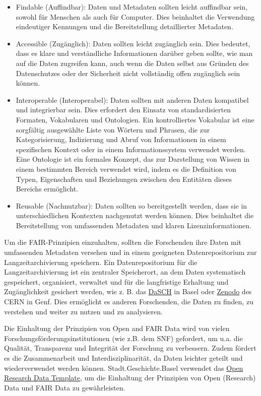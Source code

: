 \documentclass[
  nswissgerman,
  letterpaper,
  DIV=11,
  numbers=noendperiod]{scrartcl}
\begin{document}
\begin{itemize}
\item
  Findable (Auffindbar): Daten und Metadaten sollten leicht auffindbar
  sein, sowohl für Menschen als auch für Computer. Dies beinhaltet die
  Verwendung eindeutiger Kennungen und die Bereitstellung detaillierter
  Metadaten.
\item
  Accessible (Zugänglich): Daten sollten leicht zugänglich sein. Dies
  bedeutet, dass es klare und verständliche Informationen darüber geben
  sollte, wie man auf die Daten zugreifen kann, auch wenn die Daten
  selbst aus Gründen des Datenschutzes oder der Sicherheit nicht
  vollständig offen zugänglich sein können.
\item
  Interoperable (Interoperabel): Daten sollten mit anderen Daten
  kompatibel und integrierbar sein. Dies erfordert den Einsatz von
  standardisierten Formaten, Vokabularen und Ontologien. Ein
  kontrolliertes Vokabular ist eine sorgfältig ausgewählte Liste von
  Wörtern und Phrasen, die zur Kategorisierung, Indizierung und Abruf
  von Informationen in einem spezifischen Kontext oder in einem
  Informationssystem verwendet werden. Eine Ontologie ist ein formales
  Konzept, das zur Darstellung von Wissen in einem bestimmten Bereich
  verwendet wird, indem es die Definition von Typen, Eigenschaften und
  Beziehungen zwischen den Entitäten dieses Bereichs ermöglicht.
\item
  Reusable (Nachnutzbar): Daten sollten so bereitgestellt werden, dass
  sie in unterschiedlichen Kontexten nachgenutzt werden können. Dies
  beinhaltet die Bereitstellung von umfassenden Metadaten und klaren
  Lizenzinformationen.
\end{itemize}

Um die FAIR-Prinzipien einzuhalten, sollten die Forschenden ihre Daten
mit umfassenden Metadaten versehen und in einem geeigneten
Datenrepositorium zur Langzeitarchivierung speichern. Ein
Datenrepositorium für die Langzeitarchivierung ist ein zentraler
Speicherort, an dem Daten systematisch gespeichert, organisiert,
verwaltet und für die langfristige Erhaltung und Zugänglichkeit
gesichert werden, wie z. B. das \href{https://www.dasch.swiss/}{DaSCH}
in Basel oder \href{https://zenodo.org/}{Zenodo} des CERN in Genf. Dies
ermöglicht es anderen Forschenden, die Daten zu finden, zu verstehen und
weiter zu nutzen und zu analysieren.

Die Einhaltung der Prinzipien von Open and FAIR Data wird von vielen
Forschungsförderungsinstitutionen (wie z.B. dem SNF) gefordert, um u.a.
die Qualität, Transparenz und Integrität der Forschung zu verbessern.
Zudem fördert es die Zusammenarbeit und Interdisziplinarität, da Daten
leichter geteilt und wiederverwendet werden können.
Stadt.Geschichte.Basel verwendet das
\href{https://github.com/maehr/open-research-data-template}{Open
Research Data Template}, um die Einhaltung der Prinzipien von Open
(Research) Data und FAIR Data zu gewährleisten.
\end{document}
